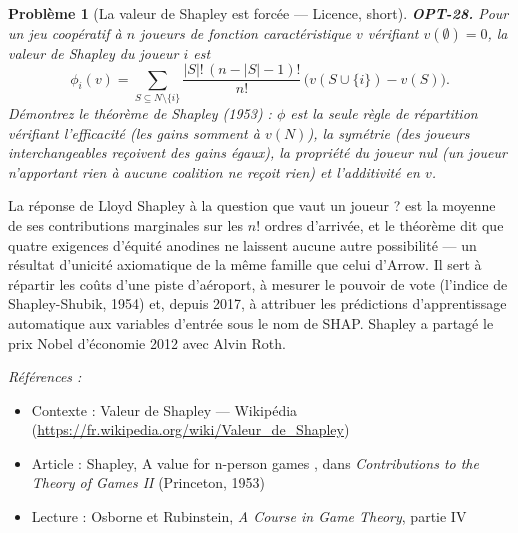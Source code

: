 \documentclass[11pt]{article}
\newtheorem{problem}{Problème}
\newenvironment{refs}{\par\small\noindent\emph{Références :}\begin{itemize}\setlength\itemsep{0pt}}{\end{itemize}\normalsize}
\begin{document}
\begin{problem}[{La valeur de Shapley est forcée --- Licence, short}]
\textbf{OPT-28.} Pour un jeu coopératif à $n$ joueurs de fonction
caractéristique $v$ vérifiant $v(\emptyset) = 0$, la valeur de Shapley du joueur $i$ est
\[ \phi_i(v) = \sum_{S \subseteq N \setminus \{i\}} \frac{|S|!\,(n - |S| - 1)!}{n!}\,
\bigl( v(S \cup \{i\}) - v(S) \bigr). \]
Démontrez le théorème de Shapley (1953) : $\phi$ est la \textit{seule} règle de répartition vérifiant
l'efficacité (les gains somment à $v(N)$), la symétrie (des joueurs interchangeables reçoivent des
gains égaux), la propriété du joueur nul (un joueur n'apportant rien à aucune coalition ne reçoit
rien) et l'additivité en $v$.
\end{problem}

\noindent La réponse de Lloyd Shapley à la question \og{} que vaut un joueur ? \fg{} est la moyenne
de ses contributions marginales sur les $n!$ ordres d'arrivée, et le théorème dit que quatre
exigences d'équité anodines ne laissent aucune autre possibilité --- un résultat d'unicité axiomatique
de la même famille que celui d'Arrow. Il sert à répartir les coûts d'une piste d'aéroport, à mesurer
le pouvoir de vote (l'indice de Shapley-Shubik, 1954) et, depuis 2017, à attribuer les prédictions
d'apprentissage automatique aux variables d'entrée sous le nom de SHAP. Shapley a partagé le prix
Nobel d'économie 2012 avec Alvin Roth.

\begin{refs}
\item Contexte : Valeur de Shapley --- Wikipédia (\url{https://fr.wikipedia.org/wiki/Valeur_de_Shapley})
\item Article : Shapley, \og{} A value for n-person games \fg{}, dans \textit{Contributions to the Theory of Games II} (Princeton, 1953)
\item Lecture : Osborne et Rubinstein, \textit{A Course in Game Theory}, partie IV
\end{refs}

\bigskip
\end{document}
